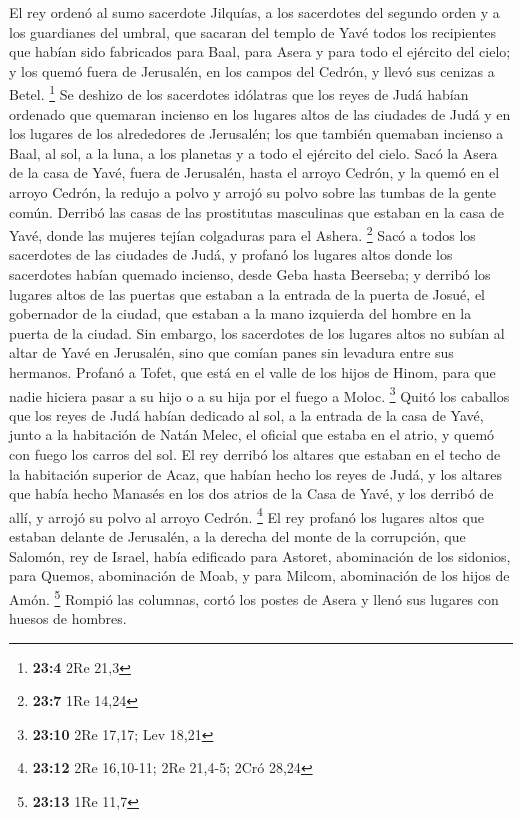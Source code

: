  El rey ordenó al sumo sacerdote Jilquías, a los
sacerdotes del segundo orden y a los guardianes del umbral, que sacaran
del templo de Yavé todos los recipientes que habían sido fabricados para
Baal, para Asera y para todo el ejército del cielo; y los quemó fuera de
Jerusalén, en los campos del Cedrón, y llevó sus cenizas a Betel.
\footnote{\textbf{23:4} 2Re 21,3}  Se deshizo de los
sacerdotes idólatras que los reyes de Judá habían ordenado que quemaran
incienso en los lugares altos de las ciudades de Judá y en los lugares
de los alrededores de Jerusalén; los que también quemaban incienso a
Baal, al sol, a la luna, a los planetas y a todo el ejército del cielo.
 Sacó la Asera de la casa de Yavé, fuera de Jerusalén,
hasta el arroyo Cedrón, y la quemó en el arroyo Cedrón, la redujo a
polvo y arrojó su polvo sobre las tumbas de la gente común.
 Derribó las casas de las prostitutas masculinas que
estaban en la casa de Yavé, donde las mujeres tejían colgaduras para el
Ashera. \footnote{\textbf{23:7} 1Re 14,24}  Sacó a todos
los sacerdotes de las ciudades de Judá, y profanó los lugares altos
donde los sacerdotes habían quemado incienso, desde Geba hasta Beerseba;
y derribó los lugares altos de las puertas que estaban a la entrada de
la puerta de Josué, el gobernador de la ciudad, que estaban a la mano
izquierda del hombre en la puerta de la ciudad.  Sin
embargo, los sacerdotes de los lugares altos no subían al altar de Yavé
en Jerusalén, sino que comían panes sin levadura entre sus hermanos.
 Profanó a Tofet, que está en el valle de los hijos de
Hinom, para que nadie hiciera pasar a su hijo o a su hija por el fuego a
Moloc. \footnote{\textbf{23:10} 2Re 17,17; Lev 18,21} 
Quitó los caballos que los reyes de Judá habían dedicado al sol, a la
entrada de la casa de Yavé, junto a la habitación de Natán Melec, el
oficial que estaba en el atrio, y quemó con fuego los carros del sol.
 El rey derribó los altares que estaban en el techo de la
habitación superior de Acaz, que habían hecho los reyes de Judá, y los
altares que había hecho Manasés en los dos atrios de la Casa de Yavé, y
los derribó de allí, y arrojó su polvo al arroyo Cedrón. \footnote{\textbf{23:12}
  2Re 16,10-11; 2Re 21,4-5; 2Cró 28,24}  El rey profanó
los lugares altos que estaban delante de Jerusalén, a la derecha del
monte de la corrupción, que Salomón, rey de Israel, había edificado para
Astoret, abominación de los sidonios, para Quemos, abominación de Moab,
y para Milcom, abominación de los hijos de Amón. \footnote{\textbf{23:13}
  1Re 11,7}  Rompió las columnas, cortó los postes de
Asera y llenó sus lugares con huesos de hombres.

